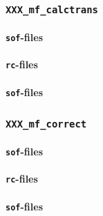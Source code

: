\subsubsection{\texttt{XXX\_mf\_calctrans}}\label{app:mf_calctrans_recipe}
\paragraph{\texttt{sof}-files\newline}\label{app:mf_calctrans_sof}
\paragraph{\texttt{rc}-files\\}\label{app:mf_calctrans_rc}
\paragraph{\texttt{sof}-files\newline}\label{app:mf_calctrans_output}

\subsubsection{\texttt{XXX\_mf\_correct}}\label{app:mf_correct_recipe}
\paragraph{\texttt{sof}-files\newline}\label{app:mf_correct_sof}
\paragraph{\texttt{rc}-files\\}\label{app:mf_correct_rc}
\paragraph{\texttt{sof}-files\newline}\label{app:mf_correct_output}
